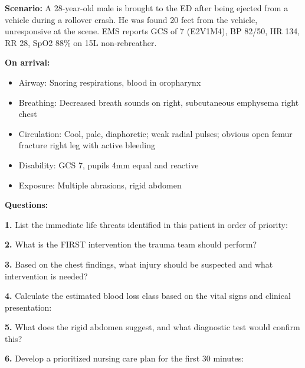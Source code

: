 \documentclass[11pt]{article}
\begin{document}
\begin{tcolorbox}[colback=purple!5!white,colframe=purple!75!black,title=Complex Case Study 1: Multi-System Trauma]

\textbf{Scenario:} A 28-year-old male is brought to the ED after being ejected from a vehicle during a rollover crash. He was found 20 feet from the vehicle, unresponsive at the scene. EMS reports GCS of 7 (E2V1M4), BP 82/50, HR 134, RR 28, SpO2 88\% on 15L non-rebreather.

\textbf{On arrival:}
\begin{itemize}
    \item Airway: Snoring respirations, blood in oropharynx
    \item Breathing: Decreased breath sounds on right, subcutaneous emphysema right chest
    \item Circulation: Cool, pale, diaphoretic; weak radial pulses; obvious open femur fracture right leg with active bleeding
    \item Disability: GCS 7, pupils 4mm equal and reactive
    \item Exposure: Multiple abrasions, rigid abdomen
\end{itemize}
\end{tcolorbox}

\textbf{Questions:}

\textbf{1.} List the immediate life threats identified in this patient in order of priority:

\vspace{2cm}

\textbf{2.} What is the FIRST intervention the trauma team should perform?

\vspace{1.5cm}

\textbf{3.} Based on the chest findings, what injury should be suspected and what intervention is needed?

\vspace{1.5cm}

\textbf{4.} Calculate the estimated blood loss class based on the vital signs and clinical presentation:

\vspace{1.5cm}

\textbf{5.} What does the rigid abdomen suggest, and what diagnostic test would confirm this?

\vspace{1.5cm}

\textbf{6.} Develop a prioritized nursing care plan for the first 30 minutes:
\end{document}

